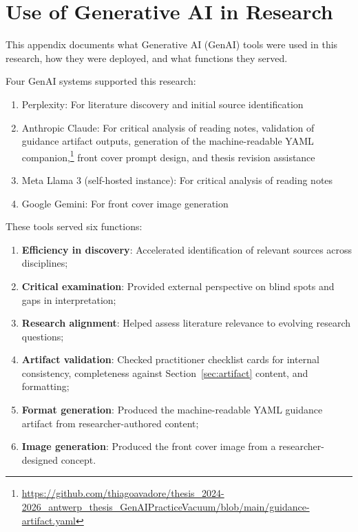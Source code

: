 \section[Appendix - Use of Generative AI in Research]{Use of Generative AI in Research}\label{app:genai}

This appendix documents what Generative AI (GenAI) tools were used in this
research, how they were deployed, and what functions they served.

Four GenAI systems supported this research:

\begin{enumerate}
    \item Perplexity: For literature discovery and initial source identification
    \item Anthropic Claude: For critical analysis of reading notes, validation of
          guidance artifact outputs, generation of the machine-readable YAML
          companion,\footnote{\url{https://github.com/thiagoavadore/thesis_2024-2026_antwerp_thesis_GenAIPracticeVacuum/blob/main/guidance-artifact.yaml}} front cover prompt design,
          and thesis revision assistance
    \item Meta Llama 3 (self-hosted instance): For critical analysis of reading notes
    \item Google Gemini: For front cover image generation
\end{enumerate}

These tools served six functions:

\begin{enumerate}
    \item \textbf{Efficiency in discovery}: Accelerated identification of relevant
          sources across disciplines;
    \item \textbf{Critical examination}: Provided external perspective on blind spots
          and gaps in interpretation;
    \item \textbf{Research alignment}: Helped assess literature relevance to evolving
          research questions;
    \item \textbf{Artifact validation}: Checked practitioner checklist cards for
          internal consistency, completeness against Section~\ref{sec:artifact}
          content, and formatting;
    \item \textbf{Format generation}: Produced the machine-readable YAML guidance
          artifact from researcher-authored content;
    \item \textbf{Image generation}: Produced the front cover image from a
          researcher-designed concept.
\end{enumerate}

